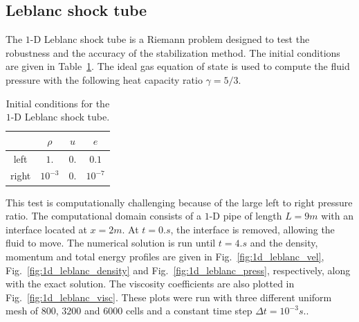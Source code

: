 \documentclass[preprint,10pt]{elsarticle}
\newcommand{\fig}[1]{Fig.~\ref{#1}}                      %
\newcommand{\tbl}[1]{Table~\ref{#1}}                     %
\begin{document}
\subsection{Leblanc shock tube} \label{sec:Leblanc}
The $1$-D Leblanc shock tube is a Riemann problem designed to test the robustness and the accuracy of the stabilization method. The initial conditions are given in \tbl{tbl:ic_leblanc}. The ideal gas equation of state is used to compute the fluid pressure with the following heat capacity ratio $\gamma=5/3$.
\begin{table}[H]
\begin{center}
 \caption{\label{tbl:ic_leblanc} Initial conditions for the $1$-D Leblanc shock tube.}
 \begin{tabular}{|c|c|c|c|}
 \hline
   & $\rho$ & $u$ & $e$ \\
 \hline
left & $1.$ & $0.$ & $0.1$ \\
  \hline
  right & $10^{-3}$ & $0.$ & $10^{-7}$ \\
  \hline
\end{tabular}
\end{center}
\nonumber
\end{table}
This test is computationally challenging because of the large left to right pressure ratio.
The computational domain consists of a $1$-D pipe of length $L=9m$ with an interface located at $x=2m$. At $t=0.s$, the interface is removed, allowing the fluid to move. The numerical solution is run until $t=4.s$ and the density, momentum and total energy profiles are given in \fig{fig:1d_leblanc_vel}, \fig{fig:1d_leblanc_density} and \fig{fig:1d_leblanc_press}, respectively, along with the exact solution. The viscosity coefficients are also plotted in \fig{fig:1d_leblanc_visc}. These plots were  run with three different uniform mesh of $800$, $3200$ and $6000$ cells and a constant time step $\Delta t = 10^{-3}s.$.
\end{document}
